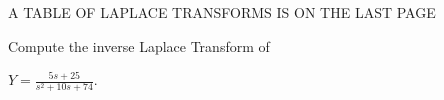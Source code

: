 \documentclass[12pt]{exam}
\begin{document}
    
    


\vspace{1cm}
\begin{center}
    A TABLE OF LAPLACE TRANSFORMS IS ON THE LAST PAGE
\end{center}

\newpage \InitialsRight


\begin{questions}
        
        
        
        
    \question[5] Compute the inverse Laplace Transform of  
    
    
    
    $\displaystyle Y = \frac{5s+25}{s^2+10s+74}$. %
    

    
        
\newpage %
    
    

\end{questions}
\end{document}
